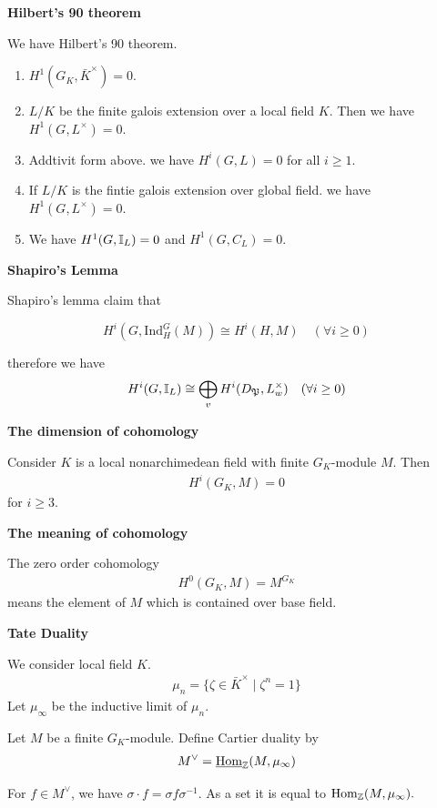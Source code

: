 {\textbf{Hilbert's 90 theorem}

We have Hilbert's 90 theorem.
\begin{enumerate}
    \item $H^1(G_K,\bar{K}^\times)=0$.
    \item $L/K$ be the finite galois extension over a local field $K$. Then we have $H^1(G, L^\times) = 0.$
    \item Addtivit form above. we have $H^i(G, L) = 0$ for all $i\ge 1$.
    \item If $L/K$ is the fintie galois extension over global field. we have $H^1(G, L^\times) = 0.$
    \item We have $H^1(G, \mathbb{I}_L) = 0$ and $H^1(G, C_L) = 0$.
\end{enumerate}


\textbf{Shapiro's Lemma}

Shapiro's lemma claim that 

$$H^i(G, \mathrm{Ind}_H^G(M)) \cong H^i(H, M) \quad (\forall i \ge 0)$$

therefore we have 
$$H^i(G, \mathbb{I}_L) \cong \bigoplus_{v} H^i(D_{\mathfrak{P}}, L_w^\times) \quad (\forall i \ge 0)$$

\textbf{The dimension of cohomology}

Consider $K$ is a local nonarchimedean field with finite $G_K$-module $M$.
Then 
\begin{align*}
    H^i(G_K,M) = 0
\end{align*}
for $i\ge 3$.

\textbf{The meaning of cohomology}

The zero order cohomology
\begin{align*}
    H^0(G_K,M) = M^{G_K}
\end{align*}
means the element of $M$ which is contained over base field.


\textbf{Tate Duality}

We consider local field $K$. 
\begin{align*}
    \mu_n = \{\zeta\in\bar{K}^\times\mid \zeta^n=1\}
\end{align*}
Let $\mu_\infty$ be the inductive limit of $\mu_n$.


Let $M$ be a finite $G_K$-module. Define Cartier duality by
\begin{align*}
    M^\vee = \operatorname{\underline{Hom}}_{\mathbb{Z}}(M,\mu_{\infty})
\end{align*}

For $f\in M^\vee$, we have $\sigma \cdot f= \sigma f \sigma^{-1}$.
As a set it is equal to $\operatorname{Hom}_{\mathbb{Z}}(M,\mu_{\infty}).$


}
